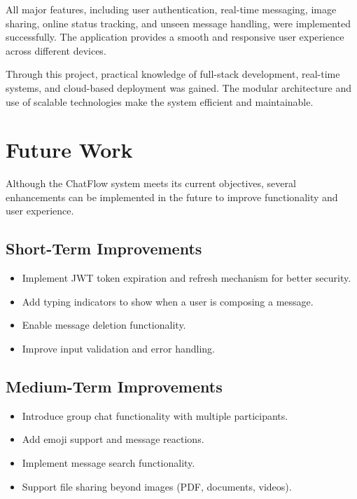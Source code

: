 \documentclass[12pt,a4paper]{report}
\begin{document}
All major features, including user authentication, real-time messaging, image sharing, online status tracking, and unseen message handling, were implemented successfully. The application provides a smooth and responsive user experience across different devices.

Through this project, practical knowledge of full-stack development, real-time systems, and cloud-based deployment was gained. The modular architecture and use of scalable technologies make the system efficient and maintainable.

\section{Future Work}

Although the ChatFlow system meets its current objectives, several enhancements can be implemented in the future to improve functionality and user experience.

\subsection{Short-Term Improvements}

\begin{itemize}
    \item Implement JWT token expiration and refresh mechanism for better security.
    \item Add typing indicators to show when a user is composing a message.
    \item Enable message deletion functionality.
    \item Improve input validation and error handling.
\end{itemize}

\subsection{Medium-Term Improvements}

\begin{itemize}
    \item Introduce group chat functionality with multiple participants.
    \item Add emoji support and message reactions.
    \item Implement message search functionality.
    \item Support file sharing beyond images (PDF, documents, videos).
\end{itemize}
\end{document}
